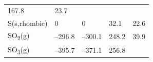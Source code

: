 \documentclass[
]{book}
\theoremstyle{definition}
\theoremstyle{definition}
\theoremstyle{definition}
\theoremstyle{remark}
\begin{document}
\begin{longtable}[]{@{}lllll@{}}
\begin{minipage}[t]{0.18\columnwidth}
167.8\strut
\end{minipage} & \begin{minipage}[t]{0.18\columnwidth}\raggedright
23.7\strut
\end{minipage}\tabularnewline
\begin{minipage}[t]{0.10\columnwidth}\raggedright
S(s,rhombic)\strut
\end{minipage} & \begin{minipage}[t]{0.19\columnwidth}\raggedright
0\strut
\end{minipage} & \begin{minipage}[t]{0.20\columnwidth}\raggedright
0\strut
\end{minipage} & \begin{minipage}[t]{0.18\columnwidth}\raggedright
32.1\strut
\end{minipage} & \begin{minipage}[t]{0.18\columnwidth}\raggedright
22.6\strut
\end{minipage}\tabularnewline
\begin{minipage}[t]{0.10\columnwidth}\raggedright
SO\textsubscript{2}(g)\strut
\end{minipage} & \begin{minipage}[t]{0.19\columnwidth}\raggedright
--296.8\strut
\end{minipage} & \begin{minipage}[t]{0.20\columnwidth}\raggedright
--300.1\strut
\end{minipage} & \begin{minipage}[t]{0.18\columnwidth}\raggedright
248.2\strut
\end{minipage} & \begin{minipage}[t]{0.18\columnwidth}\raggedright
39.9\strut
\end{minipage}\tabularnewline
\begin{minipage}[t]{0.10\columnwidth}\raggedright
SO\textsubscript{3}(g)\strut
\end{minipage} & \begin{minipage}[t]{0.19\columnwidth}\raggedright
--395.7\strut
\end{minipage} & \begin{minipage}[t]{0.20\columnwidth}\raggedright
--371.1\strut
\end{minipage} & \begin{minipage}[t]{0.18\columnwidth}\raggedright
256.8\strut
\end{minipage} & \begin{minipage}[t]{0.18\columnwidth}\raggedright

\end{minipage}
\end{longtable}
\end{document}
